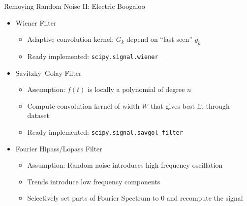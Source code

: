 \begin{frame}{Removing Random Noise II: Electric Boogaloo}
%
\begin{itemize}
\item Wiener Filter
	\begin{itemize}
	\item Adaptive convolution kernel: $G_k$ depend on \enquote{last seen} $y_k$
	\item Ready implemented: \texttt{scipy.signal.wiener} 
	\end{itemize}
\item Savitzky–Golay Filter
	\begin{itemize}
	\item Assumption: $f(t)$ is locally a polynomial of degree $n$
	\item Compute convolution kernel of width $W$ that gives best fit through dataset
	\item Ready implemented: \texttt{scipy.signal.savgol\_filter} 
	\end{itemize}
\item Fourier Hipass/Lopass Filter
	\begin{itemize}
	\item Assumption: Random noise introduces high frequency oscillation
	\item Trends introduce low frequency components
	\item[\Thus] Selectively set parts of Fourier Spectrum to 0 and recompute the signal
	\end{itemize}
\end{itemize}
%
\end{frame}


